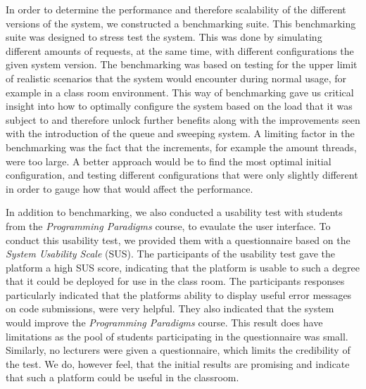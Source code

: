 In order to determine the performance and therefore scalability of the different versions of the system, we constructed a benchmarking suite. 
This benchmarking suite was designed to stress test the system. 
This was done by simulating different amounts of requests, at the same time, with different configurations the given system version. The benchmarking was based on testing for the upper limit of realistic scenarios that the system would encounter during normal usage, for example in a class room environment. 
This way of benchmarking gave us critical insight into how to optimally configure the system based on the load that it was subject to and therefore unlock further benefits along with the improvements seen with the introduction of the queue and sweeping system. A limiting factor in the benchmarking was the fact that the increments, for example the amount threads, were too large. 
A better approach would be to find the most optimal initial configuration, and testing different configurations that were only slightly different in order to gauge how that would affect the performance. 

In addition to benchmarking, we also conducted a usability test with students from the \textit{Programming Paradigms} course, to evaulate the user interface. To conduct this usability test, we provided them with a questionnaire based on the \textit{System Usability Scale} (SUS). 
The participants of the usability test gave the platform a high SUS score, indicating that the platform is usable to such a degree that it could be deployed for use in the class room. The participants responses particularly indicated that the platforms ability to display useful error messages on code submissions, were very helpful. 
They also indicated that the system would improve the \textit{Programming Paradigms} course. This result does have limitations as the pool of students participating in the questionnaire was small. 
Similarly, no lecturers were given a questionnaire, which limits the credibility of the test. We do, however feel, that the initial results are promising and indicate that such a platform could be useful in the classroom.
 

